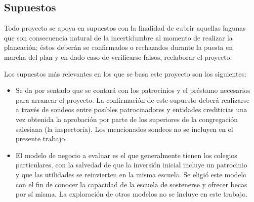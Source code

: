 

\subsection{Supuestos}
\label{sub:Supuestos}


Todo proyecto se apoya en supuestos con la finalidad de cubrir aquellas lagunas que son consecuencia natural de la incertidumbre al momento de realizar la planeación; éstos deberán se confirmados o rechazados durante la puesta en marcha del plan y en dado caso de verificarse falsos, reelaborar el proyecto.

Los supuestos más relevantes en los que se basa este proyecto son los siguientes:

\begin{itemize}
	\item Se da por sentado que se contará con los patrocinios y el préstamo necesarios para arrancar el proyecto. La confirmación de este supuesto deberá realizarse a través de sondeos entre posibles patrocinadores y entidades crediticias una vez obtenida la aprobación por parte de los superiores de la congregación salesiana (la inspectoría). Los mencionados sondeos no se incluyen en el presente trabajo.
	\item El modelo de negocio a evaluar es el que generalmente tienen los colegios particulares, con la salvedad de que la inversión inicial incluye un patrocinio y que las utilidades se reinvierten en la misma escuela. Se eligió este modelo con el fin de conocer la capacidad de la escuela de sostenerse y ofrecer becas por sí misma. La exploración de otros modelos no se incluye en este trabajo.
\end{itemize}

